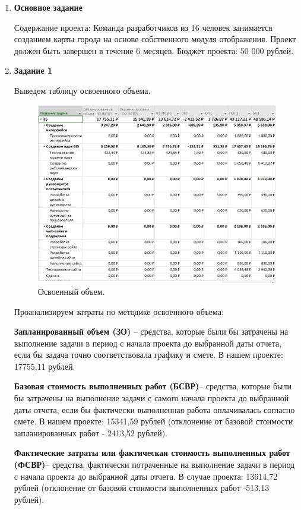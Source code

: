 \documentclass[a4paper,14pt]{extreport} %
\begin{document}
\begin{enumerate}

\item \textbf{Основное задание}

Содержание проекта: Команда разработчиков из 16 человек занимается созданием карты города на основе собственного модуля отображения. Проект должен быть завершен в течение 6 месяцев. Бюджет проекта: 50 000 рублей.

\item \textbf{Задание 1}

Выведем таблицу освоенного объема.

\begin{figure}[H]
  \centering
  \caption{Освоенный объем. }
  \includegraphics[scale=0.7]{11}
\end{figure}

Проанализируем затраты по методике освоенного объема:

\textbf{Запланированный объем (ЗО)} -- средства, которые были бы затрачены на выполнение задачи в период с начала проекта до выбранной даты отчета, если бы задача точно соответствовала графику и смете. В нашем проекте: 17755,11 рублей.

\textbf{Базовая стоимость выполненных работ (БСВР)}-- средства, которые были бы затрачены на выполнение задачи с самого начала проекта до выбранной даты отчета, если бы фактически выполненная работа оплачивалась согласно смете. В нашем проекте: 15341,59 рублей (отклонение от базовой стоимости запланированных работ - 2413,52 рублей).

\newpage
\textbf{Фактические затраты или фактическая стоимость выполненных работ (ФСВР)}-- средства, фактически потраченные на выполнение задачи в период с начала проекта до выбранной даты отчета. В случае проекта: 13614,72 рублей (отклонение от базовой стоимости выполненных работ -513,13 рублей). 


\end{enumerate}
\end{document}

